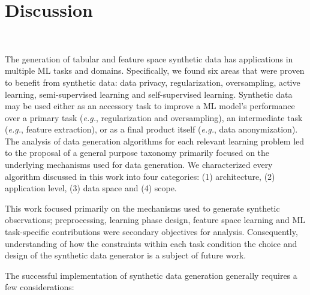 \documentclass[parskip=full]{scrartcl}
\begin{document}
\section{Discussion}~\label{sec:discussion}

The generation of tabular and feature space synthetic data has applications in
multiple ML tasks and domains. Specifically, we found six areas that were
proven to benefit from synthetic data: data privacy, regularization,
oversampling, active learning, semi-supervised learning and self-supervised
learning. Synthetic data may be used either as an accessory task to improve a
ML model's performance over a primary task (\textit{e.g.}, regularization and
oversampling), an intermediate task (\textit{e.g.}, feature extraction), or as
a final product itself (\textit{e.g.}, data anonymization). The analysis of
data generation algorithms for each relevant learning problem led to the
proposal of a general purpose taxonomy primarily focused on the underlying
mechanisms used for data generation. We characterized every algorithm
discussed in this work into four categories: (1) architecture, (2) application
level, (3) data space and (4) scope.

This work focused primarily on the mechanisms used to generate synthetic
observations; preprocessing, learning phase design, feature space learning and
ML task-specific contributions were secondary objectives for analysis.
Consequently, understanding of how the constraints within each task condition
the choice and design of the synthetic data generator is a subject of future
work.

The successful implementation of synthetic data generation generally requires
a few considerations:
\end{document}

